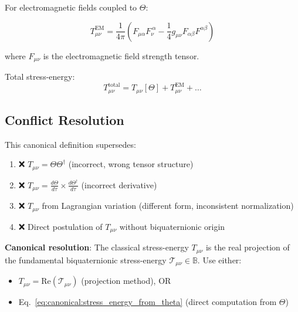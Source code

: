 For electromagnetic fields coupled to $\Theta$:

\begin{equation}
\label{eq:canonical:stress_em}
T_{\mu\nu}^{\text{EM}} = \frac{1}{4\pi}\left(F_{\mu\alpha}F_\nu^{\ \alpha} - \frac{1}{4}g_{\mu\nu}F_{\alpha\beta}F^{\alpha\beta}\right)
\end{equation}

where $F_{\mu\nu}$ is the electromagnetic field strength tensor.

Total stress-energy:
\begin{equation}
T_{\mu\nu}^{\text{total}} = T_{\mu\nu}[\Theta] + T_{\mu\nu}^{\text{EM}} + \ldots
\end{equation}

\subsection{Conflict Resolution}

This canonical definition supersedes:

\begin{enumerate}
    \item ❌ $T_{\mu\nu} = \Theta\Theta^\dagger$ (incorrect, wrong tensor structure)
    \item ❌ $T_{\mu\nu} = \frac{d\Theta}{d\tau} \times \frac{d\Theta^\dagger}{d\tau}$ (incorrect derivative)
    \item ❌ $T_{\mu\nu}$ from Lagrangian variation (different form, inconsistent normalization)
    \item ❌ Direct postulation of $T_{\mu\nu}$ without biquaternionic origin
\end{enumerate}

\textbf{Canonical resolution}: The classical stress-energy $T_{\mu\nu}$ is the real projection of the fundamental biquaternionic stress-energy $\mathcal{T}_{\mu\nu} \in \mathbb{B}$. Use either:
\begin{itemize}
    \item $T_{\mu\nu} = \text{Re}(\mathcal{T}_{\mu\nu})$ (projection method), OR
    \item Eq.~\ref{eq:canonical:stress_energy_from_theta} (direct computation from $\Theta$)
\end{itemize}

